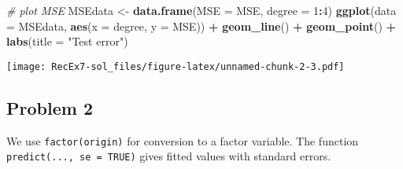\documentclass[
]{article}
\newenvironment{Shaded}{\begin{snugshade}}{\end{snugshade}}
\newcommand{\AttributeTok}[1]{\textcolor[rgb]{0.13,0.29,0.53}{#1}}
\newcommand{\CommentTok}[1]{\textcolor[rgb]{0.56,0.35,0.01}{\textit{#1}}}
\newcommand{\DecValTok}[1]{\textcolor[rgb]{0.00,0.00,0.81}{#1}}
\newcommand{\FunctionTok}[1]{\textcolor[rgb]{0.13,0.29,0.53}{\textbf{#1}}}
\newcommand{\NormalTok}[1]{#1}
\newcommand{\OtherTok}[1]{\textcolor[rgb]{0.56,0.35,0.01}{#1}}
\newcommand{\SpecialCharTok}[1]{\textcolor[rgb]{0.81,0.36,0.00}{\textbf{#1}}}
\newcommand{\StringTok}[1]{\textcolor[rgb]{0.31,0.60,0.02}{#1}}
\begin{document}
\begin{Shaded}
\begin{Highlighting}[]
\CommentTok{\# plot MSE}
\NormalTok{MSEdata }\OtherTok{\textless{}{-}} \FunctionTok{data.frame}\NormalTok{(}\AttributeTok{MSE =}\NormalTok{ MSE, }\AttributeTok{degree =} \DecValTok{1}\SpecialCharTok{:}\DecValTok{4}\NormalTok{)}
\FunctionTok{ggplot}\NormalTok{(}\AttributeTok{data =}\NormalTok{ MSEdata, }\FunctionTok{aes}\NormalTok{(}\AttributeTok{x =}\NormalTok{ degree, }\AttributeTok{y =}\NormalTok{ MSE)) }\SpecialCharTok{+}
  \FunctionTok{geom\_line}\NormalTok{() }\SpecialCharTok{+}
  \FunctionTok{geom\_point}\NormalTok{() }\SpecialCharTok{+}
  \FunctionTok{labs}\NormalTok{(}\AttributeTok{title =} \StringTok{"Test error"}\NormalTok{)}
\end{Highlighting}
\end{Shaded}

\texttt{[image: RecEx7-sol\_files/figure-latex/unnamed-chunk-2-3.pdf]}

\subsection{Problem 2}\label{problem-2}

We use \texttt{factor(origin)} for conversion to a factor variable. The
function \texttt{predict(...,\ se\ =\ TRUE)} gives fitted values with
standard errors.
\end{document}
